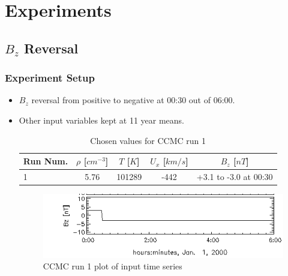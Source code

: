 \section{Experiments}



\subsection{$B_z$ Reversal}
\begin{frame}
	\frametitle{Experiment Setup}
	\begin{itemize}
 	 \item $B_z$ reversal from positive to negative at 00:30 out of 06:00. 
 	 \item Other input variables kept at 11 year means.
 	\begin{table}
 	\small
	\begin{center}
  	\caption{Chosen values for CCMC run 1}
  	\begin{tabular}{| l | c | c | c | c | }
    \hline
    \textbf{Run Num.} & \textbf{$\rho$} [$cm^{-3}$] & \textbf{$T$} [$K$] &
    \textbf{$U_x$} [$km/s$] &
    \textbf{$B_z$} [$nT$]
    \\
    \hline 
    1 & 5.76 & 101289 & -442  & +3.1 to -3.0 at 00:30 \\ \hline
  \end{tabular}
  \label{table:runs12}
\end{center}
\end{table}
	\begin{figure}
		\includegraphics[scale=0.3]{images/CCMCRun1.png}
		\caption{CCMC run 1 plot of input time series }
	\end{figure}
	\end{itemize}
\end{frame}

